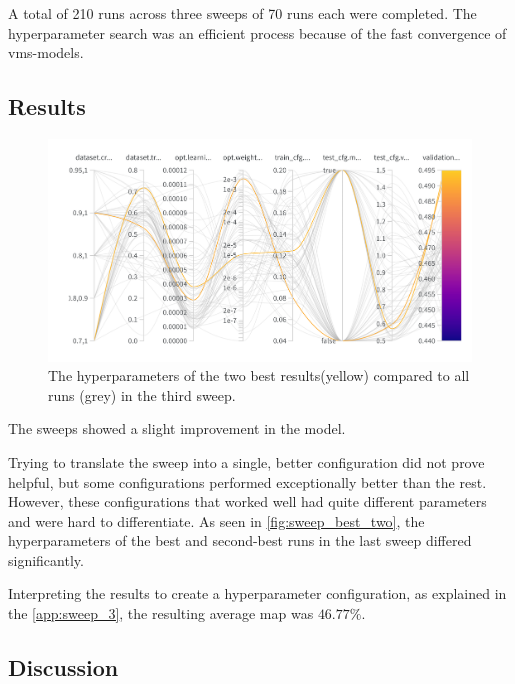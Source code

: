 A total of 210 runs across three sweeps of 70 runs each were completed. The hyperparameter search was an efficient process because of the fast convergence of \acrshort{vms}-models. 


\subsection{Results}
\label{ssec:ex4_results}

\begin{figure}[ht]
    \centering
    \includegraphics[width=1\linewidth]{figures/sweep_two_best.png}
    \caption{The hyperparameters of the two best results(yellow) compared to all runs (grey) in the third sweep. }
    \label{fig:sweep_best_two}
\end{figure}

The sweeps showed a slight improvement in the model. 

Trying to translate the sweep into a single, better configuration did not prove helpful, but some configurations performed exceptionally better than the rest. However, these configurations that worked well had quite different parameters and were hard to differentiate. As seen in \autoref{fig:sweep_best_two}, the hyperparameters of the best and second-best runs in the last sweep differed significantly. 

Interpreting the results to create a hyperparameter configuration, as explained in the \autoref{app:sweep_3}, the resulting average \acrshort{map} was \(46.77\%\). 

\subsection{Discussion}
\label{ssec:ex4_discussion}


